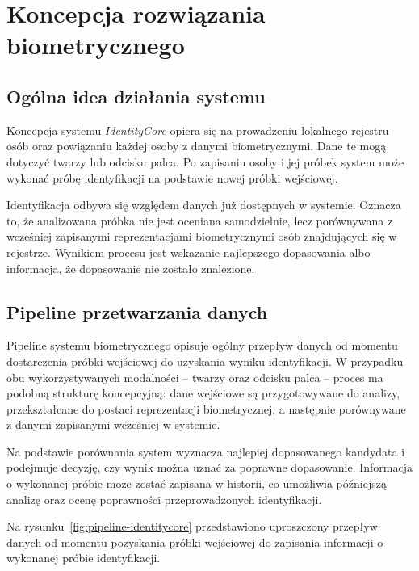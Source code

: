 \chapter{Koncepcja rozwiązania biometrycznego}
\label{chap:koncepcja-rozwiazania}

\section{Ogólna idea działania systemu}

Koncepcja systemu \textit{IdentityCore} opiera się na prowadzeniu lokalnego rejestru osób oraz powiązaniu każdej osoby z danymi biometrycznymi. Dane te mogą dotyczyć twarzy lub odcisku palca. Po zapisaniu osoby i jej próbek system może wykonać próbę identyfikacji na podstawie nowej próbki wejściowej.

Identyfikacja odbywa się względem danych już dostępnych w systemie. Oznacza to, że analizowana próbka nie jest oceniana samodzielnie, lecz porównywana z wcześniej zapisanymi reprezentacjami biometrycznymi osób znajdujących się w rejestrze. Wynikiem procesu jest wskazanie najlepszego dopasowania albo informacja, że dopasowanie nie zostało znalezione.

\section{Pipeline przetwarzania danych}

Pipeline systemu biometrycznego opisuje ogólny przepływ danych od momentu dostarczenia próbki wejściowej do uzyskania wyniku identyfikacji. W przypadku obu wykorzystywanych modalności -- twarzy oraz odcisku palca -- proces ma podobną strukturę koncepcyjną: dane wejściowe są przygotowywane do analizy, przekształcane do postaci reprezentacji biometrycznej, a następnie porównywane z danymi zapisanymi wcześniej w systemie.

Na podstawie porównania system wyznacza najlepiej dopasowanego kandydata i podejmuje decyzję, czy wynik można uznać za poprawne dopasowanie. Informacja o wykonanej próbie może zostać zapisana w historii, co umożliwia późniejszą analizę oraz ocenę poprawności przeprowadzonych identyfikacji.

\bigskip

Na rysunku~\ref{fig:pipeline-identitycore} przedstawiono uproszczony przepływ danych od momentu pozyskania próbki wejściowej do zapisania informacji o wykonanej próbie identyfikacji.

